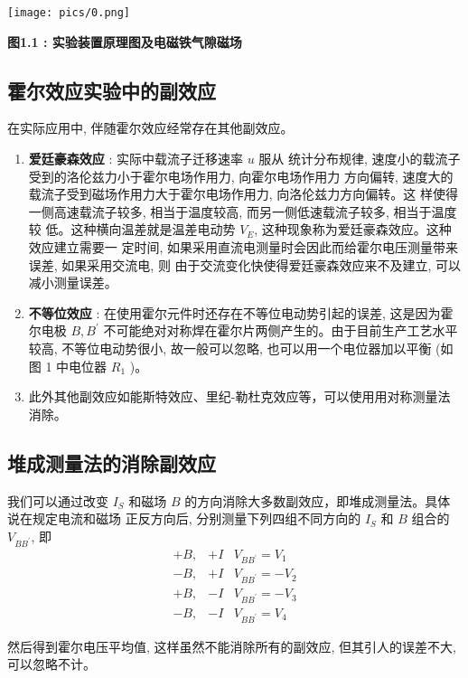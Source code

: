 \documentclass[10pt,a4paper]{article}
\makeatletter
\newenvironment{figurehere}
{\def\@captype{figure}}
{}
\makeatother
\begin{document}
	\begin{figurehere}
		\centering
		\texttt{[image: pics/0.png]}
		\caption*{\bf 图1.1 : 实验装置原理图及电磁铁气隙磁场}
	\end{figurehere}
	
	\subsection{霍尔效应实验中的副效应}

	在实际应用中, 伴随霍尔效应经常存在其他副效应。
	\begin{enumerate}
		\item {\bf 爱廷豪森效应} : 实际中载流子迁移速率 $u$ 服从 统计分布规律, 速度小的载流子受到的洛伦兹力小于霍尔电场作用力, 向霍尔电场作用力 方向偏转, 速度大的载流子受到磁场作用力大于霍尔电场作用力, 向洛伦兹力方向偏转。这 样使得一侧高速载流子较多, 相当于温度较高, 而另一侧低速载流子较多, 相当于温度较 低。这种横向温差就是温差电动势 $V_E$, 这种现象称为爱廷豪森效应。这种效应建立需要一 定时间, 如果采用直流电测量时会因此而给霍尔电压测量带来误差, 如果采用交流电, 则 由于交流变化快使得爱廷豪森效应来不及建立, 可以减小测量误差。
		\item {\bf 不等位效应} : 在使用霍尔元件时还存在不等位电动势引起的误差, 这是因为霍尔电极 $B, B^{\prime}$ 不可能绝对对称焊在霍尔片两侧产生的。由于目前生产工艺水平较高, 不等位电动势很小, 故一般可以忽略, 也可以用一个电位器加以平衡 (如图 1 中电位器 $R_1$ )。
		\item 此外其他副效应如能斯特效应、里纪-勒杜克效应等，可以使用用对称测量法消除。
		
	\end{enumerate}


	\subsection{堆成测量法的消除副效应}

	我们可以通过改变 $I_S$ 和磁场 $B$ 的方向消除大多数副效应，即堆成测量法。具体说在规定电流和磁场 正反方向后, 分别测量下列四组不同方向的 $I_S$ 和 $B$ 组合的 $V_{B B^{\prime}}$, 即
	$$
	\begin{array}{lll}
	+B, & +I & V_{B B^{\prime}}=V_1 \\
	-B, & +I & V_{B B^{\prime}}=-V_2 \\
	+B, & -I & V_{B B^{\prime}}=-V_3 \\
	-B, & -I & V_{B B^{\prime}}=V_4
	\end{array}
	$$

	然后得到霍尔电压平均值, 这样虽然不能消除所有的副效应, 但其引人的误差不大, 可以忽略不计。
\end{document}
